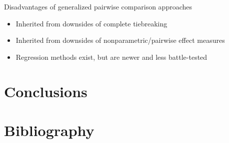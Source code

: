 \documentclass[
  11pt,
  fleqn
]{article}
\begin{document}
Disadvantages of generalized pairwise comparison approaches
\begin{itemize}
  \item Inherited from downsides of complete tiebreaking
  \item Inherited from downsides of nonparametric/pairwise effect measures
  \item Regression methods exist, but are newer and less battle-tested
\end{itemize}


\section{Conclusions}

\newpage

\section{Bibliography}

\printbibliography
\end{document}
